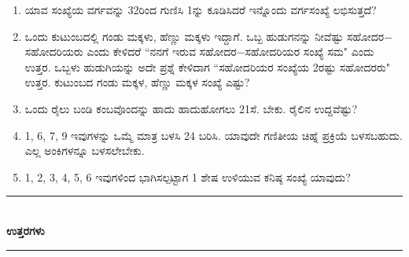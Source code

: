 \begin{enumerate}
\item ಯಾವ ಸಂಖ್ಯೆಯ ವರ್ಗವನ್ನು 32ರಿಂದ ಗುಣಿಸಿ 1ನ್ನು ಕೂಡಿಸಿದರೆ ಇನ್ನೊಂದು ವರ್ಗಸಂಖ್ಯೆ ಲಭಿಸುತ್ತದೆ? 

\item ಒಂದು ಕುಟುಂಬದಲ್ಲಿ ಗಂಡು ಮಕ್ಕಳು, ಹೆಣ್ಣು ಮಕ್ಕಳು ಇದ್ದಾಗೆ. ಒಬ್ಬ ಹುಡುಗನನ್ನು ನೀವೆಷ್ಟು ಸಹೋದರ$-$ಸಹೋದರಿಯರು ಎಂದು ಕೇಳಿದರೆ ``ನನಗೆ ಇರುವ ಸಹೋದರ$-$ಸಹೋದರಿಯರ ಸಂಖ್ಯೆ ಸಮ" ಎಂದು ಉತ್ತರ. ಒಬ್ಬಳು ಹುಡುಗಿಯನ್ನು ಅದೇ ಪ್ರಶ್ನೆ ಕೇಳಿದಾಗ ``ಸಹೋದರಿಯರ ಸಂಖ್ಯೆಯ 2ರಷ್ಟು ಸಹೋದರರು" ಉತ್ತರ. ಕುಟುಂಬದ ಗಂಡು ಮಕ್ಕಳ, ಹೆಣ್ಣು ಮಕ್ಕಳ ಸಂಖ್ಯೆ ಎಷ್ಟು? 

\item ಒಂದು ರೈಲು ಬಂಡಿ ಕಂಬವೊಂದನ್ನು ಹಾದು ಹಾದುಹೋಗಲು 21ಸೆ. ಬೇಕು. ರೈಲಿನ ಉದ್ದವೆಷ್ಟು? 

\item 1, 6, 7, 9 ಇವುಗಳನ್ನು ಒಮ್ಮೆ ಮಾತ್ರ ಬಳಸಿ 24 ಬರಿಸಿ. ಯಾವುದೇ ಗಣಿತೀಯ ಚಿಹ್ನೆ ಪ್ರಕ್ರಿಯೆ ಬಳಸಬಹುದು. ಎಲ್ಲ ಅಂಕಿಗಳನ್ನೂ ಬಳಸಲೇಬೇಕು. 

\item 1, 2, 3, 4, 5, 6 ಇವುಗಳಿಂದ ಭಾಗಿಸಲ್ಪಟ್ಟಾಗ 1 ಶೇಷ ಉಳಿಯುವ ಕನಿಷ್ಠ ಸಂಖ್ಯೆ ಯಾವುದು? 
\end{enumerate}

\smallskip

\begin{center}
\rule{5cm}{1pt}\\[3pt]
{\Large\bfseries ಉತ್ತರಗಳು}\\[-0.1cm]
\rule{5cm}{1pt}
\end{center}

